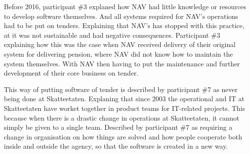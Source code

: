 
Before 2016, participant \#3 explaned how NAV had little knowledge or resources to develop software themselves. And all systems required for NAV's operations had to be put on tenders. Explaining that NAV's has stopped with this practice, at it was not sustainable and had negative consequences. Participant \#3 explaining how this was the case when NAV received delivery of their original system for delivering pension, where NAV did not know how to maintain the system themselves. With NAV then having to put the maintenance and further development of their core business on tender.


This way of putting software of tender is described by participant \#7 as never being done at Skatteetaten. Explaning that since 2003 the operational and IT at Skatteetaten have worket together in product teams for IT-related projects. This because when there is a drastic change in operations at Skatteetaten, it cannot simply be given to a single team. Described by participant \#7 as requiring a change in organisation on how things are solved and how people cooperate both inside and outside the agency, so that the software is created in a new way.

